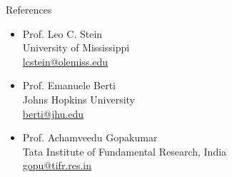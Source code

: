 \documentclass{resume} %
\begin{document}
\begin{rSection}{References}


\begin{itemize}
\item Prof. Leo C. Stein\\University of Mississippi\\ \href{lcstein@olemiss.edu}{lcstein@olemiss.edu}
\item Prof. Emanuele Berti\\Johns Hopkins University\\ \href{berti@jhu.edu}{berti@jhu.edu}
\item Prof. Achamveedu Gopakumar\\Tata Institute of Fundamental Research, India\\ \href{gopu@tifr.res.in}{gopu@tifr.res.in}
\end{itemize}


\end{rSection}
\end{document}
